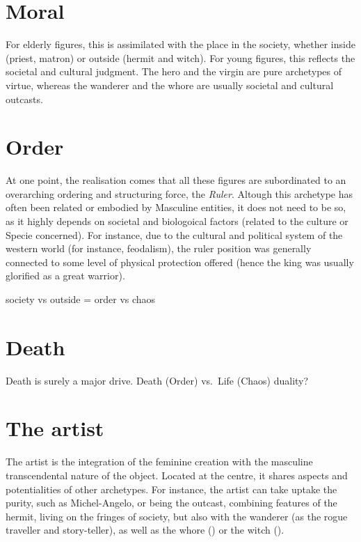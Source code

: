\documentclass[]{book}
\begin{document}
\hypertarget{moral}{%
\section{Moral}\label{moral}}

For elderly figures, this is assimilated with the place in the society, whether inside (priest, matron) or outside (hermit and witch). For young figures, this reflects the societal and cultural judgment. The hero and the virgin are pure archetypes of virtue, whereas the wanderer and the whore are usually societal and cultural outcasts.

\hypertarget{order}{%
\section{Order}\label{order}}

At one point, the realisation comes that all these figures are subordinated to an overarching ordering and structuring force, the \emph{Ruler}. Altough this archetype has often been related or embodied by Masculine entities, it does not need to be so, as it highly depends on societal and biologoical factors (related to the culture or Specie concerned). For instance, due to the cultural and political system of the western world (for instance, feodalism), the ruler position was generally connected to some level of physical protection offered (hence the king was usually glorified as a great warrior).

society vs outside = order vs chaos

\hypertarget{death}{%
\section{Death}\label{death}}

Death is surely a major drive. Death (Order) vs.~Life (Chaos) duality?

\hypertarget{the-artist}{%
\section{The artist}\label{the-artist}}

The artist is the integration of the feminine creation with the masculine transcendental nature of the object. Located at the centre, it shares aspects and potentialities of other archetypes. For instance, the artist can take uptake the purity, such as Michel-Angelo, or being the outcast, combining features of the hermit, living on the fringes of society, but also with the wanderer (as the rogue traveller and story-teller), as well as the whore () or the witch ().
\end{document}
